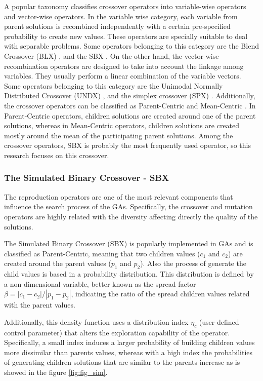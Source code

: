 A popular taxonomy classifies crossover operators into variable-wise operators and vector-wise operators.
%
In the variable wise category, each variable from parent solutions is recombined independently with a certain pre-specified probability to create new values.
%
These operators are specially suitable to deal with separable problems.
%
Some operators belonging to this category are the Blend Crossover (BLX) \cite{eshelman1993real}, and the SBX \cite{Joel:SBX1994}.
%
On the other hand, the vector-wise recombination operators are designed to take into account the linkage among variables.
%
They usually perform a linear combination of the variable vectors.
%
Some operators belonging to this category are the Unimodal Normally Distributed Crossover (UNDX) \cite{Joel:UNDX}, and the simplex crossover (SPX) \cite{Joel:DE_Storn_SPX}.
%
Additionally, the crossover operators can be classified as Parent-Centric and Mean-Centric \cite{jain2011parent}.
%
In Parent-Centric operators, children solutions are created around one of the parent solutions, whereas in Mean-Centric operators, children solutions are created mostly around the mean of the participating parent solutions.
%
Among the crossover operators, SBX is probably the most frequently used operator, so this research focuses on this crossover.

\subsubsection{The Simulated Binary Crossover - SBX}

The reproduction operators are one of the most relevant components that influence the search process of the GAs.
%
Specifically, the crossover and mutation operators are highly related with the diversity affecting directly the quality of the solutions.
%

The Simulated Binary Crossover (SBX) \cite{deb1994simulated} is popularly implemented in GAs \cite{Joel:NSGAII,Joel:SMSEMOA} and is classified as Parent-Centric, meaning that two children values ($c_1$ and $c_2$) are created around the parent values ($p_1$ and $p_2$).
%
Also the process of generate the child values is based in a probability distribution.
%
This distribution is defined by a non-dimensional variable, better known as the spread factor $\beta = |c_1 - c_2 | / |p_1 - p_2|$, indicating the ratio of the spread children values related with the parent values.
%

Additionally, this density function uses a distribution index $\eta_c$ (user-defined control parameter) that alters the exploration capability of the operator.
%
Specifically, a small index induces a larger probability of building children values more dissimilar than parents values, whereas with a high index the probabilities of generating children solutions that are similar to the parents increase as is showed in the figure \ref{fig:fig_sim}.
%

